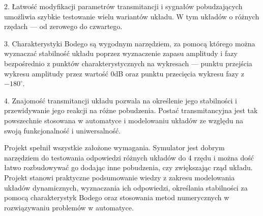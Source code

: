 \documentclass[10pt, a4paper]{article}
\begin{document}
\vspace{0.5cm}

2. Łatwość modyfikacji parametrów transmitancji i sygnałów pobudzających umożliwia szybkie testowanie wielu wariantów układu. W tym układów
o różnych rzędach --- od zerowego do czwartego. 

\vspace{0.5cm}

3. Charakterystyki Bodego są wygodnym narzędziem, za pomocą którego można wyznaczać stabilność układu poprzez wyznaczenie zapasu amplitudy i fazy
bezpośrednio z punktów charakterystycznych na wykresach --- punktu przejścia wykresu amplitudy przez wartość 0dB oraz punktu przecięcia wykresu fazy z $-180^{\circ}$.

\vspace{0.5cm}

4. Znajomość transmitancji układu pozwala na określenie jego stabilności i przewidywanie jego reakcji na różne pobudzenia. Postać transmitancyjna jest
tak powszechnie stosowana w automatyce i modelowaniu układów ze względu na swoją funkcjonalność i uniwersalność. 

\vspace{0.5cm}

Projekt spełnił wszystkie założone wymagania. Symulator jest dobrym narzędziem do testowania odpowiedzi różnych układów do 4 rzędu 
i można dość łatwo rozbudowywać go dodając inne pobudzenia, czy zwiększając rząd układu. Projekt stanowi praktyczne podsumowanie wiedzy
z zakresu modelowania układów dynamicznych, wyznaczania ich odpowiedzi, określania stabilności za pomocą charakterystyk Bodego oraz
stosowania metod numerycznych w rozwiązywaniu problemów w automatyce. 
\end{document}
